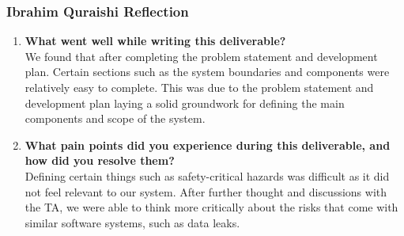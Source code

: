 \documentclass[12pt]{article}
\begin{document}
\subsubsection*{Ibrahim Quraishi Reflection}
\begin{enumerate}
    \item \textbf{What went well while writing this deliverable?} \\
   We found that after completing the problem statement and development plan. Certain sections such as the system boundaries and components were relatively easy to complete. This was due to the problem statement and development plan laying a solid groundwork for defining the main components and scope of the system.
    \item \textbf{What pain points did you experience during this deliverable, and how did you resolve them?} \\
    Defining certain things such as safety-critical hazards was difficult as it did not feel relevant to our system. After further thought and discussions with the TA, we were able to think more critically about the risks that come with similar software systems, such as data leaks. 
\end{enumerate}
\end{document}

